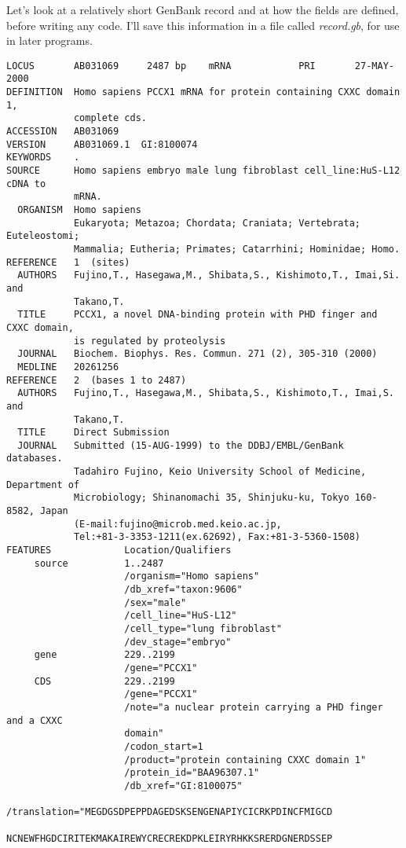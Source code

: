 Let's look at a relatively short GenBank record and at how the fields are defined, before writing any code. I'll save this information in a file called \textit{record.gb}, for use in later programs.

\begin{lstlisting}[language={},basicstyle=\small\tt,breaklines=false]
LOCUS       AB031069     2487 bp    mRNA            PRI       27-MAY-2000
DEFINITION  Homo sapiens PCCX1 mRNA for protein containing CXXC domain 1,
            complete cds.
ACCESSION   AB031069
VERSION     AB031069.1  GI:8100074
KEYWORDS    .
SOURCE      Homo sapiens embryo male lung fibroblast cell_line:HuS-L12 cDNA to
            mRNA.
  ORGANISM  Homo sapiens
            Eukaryota; Metazoa; Chordata; Craniata; Vertebrata; Euteleostomi;
            Mammalia; Eutheria; Primates; Catarrhini; Hominidae; Homo.
REFERENCE   1  (sites)
  AUTHORS   Fujino,T., Hasegawa,M., Shibata,S., Kishimoto,T., Imai,Si. and
            Takano,T.
  TITLE     PCCX1, a novel DNA-binding protein with PHD finger and CXXC domain,
            is regulated by proteolysis
  JOURNAL   Biochem. Biophys. Res. Commun. 271 (2), 305-310 (2000)
  MEDLINE   20261256
REFERENCE   2  (bases 1 to 2487)
  AUTHORS   Fujino,T., Hasegawa,M., Shibata,S., Kishimoto,T., Imai,S. and
            Takano,T.
  TITLE     Direct Submission
  JOURNAL   Submitted (15-AUG-1999) to the DDBJ/EMBL/GenBank databases.
            Tadahiro Fujino, Keio University School of Medicine, Department of
            Microbiology; Shinanomachi 35, Shinjuku-ku, Tokyo 160-8582, Japan
            (E-mail:fujino@microb.med.keio.ac.jp,
            Tel:+81-3-3353-1211(ex.62692), Fax:+81-3-5360-1508)
FEATURES             Location/Qualifiers
     source          1..2487
                     /organism="Homo sapiens"
                     /db_xref="taxon:9606"
                     /sex="male"
                     /cell_line="HuS-L12"
                     /cell_type="lung fibroblast"
                     /dev_stage="embryo"
     gene            229..2199
                     /gene="PCCX1"
     CDS             229..2199
                     /gene="PCCX1"
                     /note="a nuclear protein carrying a PHD finger and a CXXC
                     domain"
                     /codon_start=1
                     /product="protein containing CXXC domain 1"
                     /protein_id="BAA96307.1"
                     /db_xref="GI:8100075"
                     /translation="MEGDGSDPEPPDAGEDSKSENGENAPIYCICRKPDINCFMIGCD
                     NCNEWFHGDCIRITEKMAKAIREWYCRECREKDPKLEIRYRHKKSRERDGNERDSSEP

\end{lstlisting}
